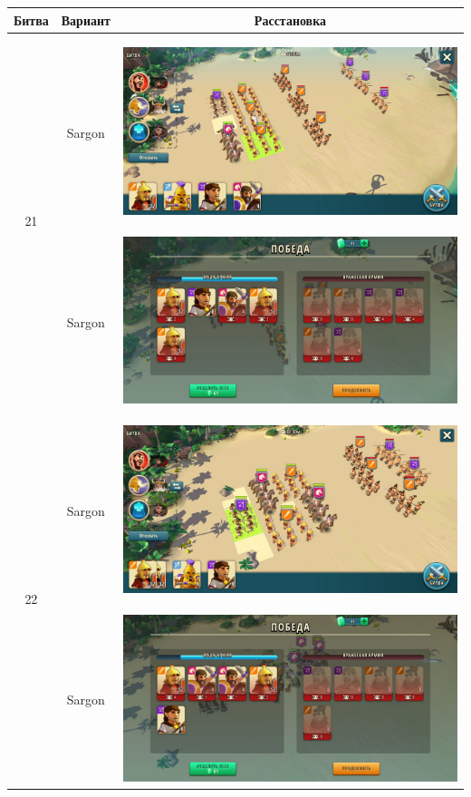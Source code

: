 \noindent
\begin{longtable}{|c|c|c|}
	\hline
	Битва & Вариант & Расстановка \\\hline\endhead
	\multirow{2}{*}{21} & Sargon &
	\hypertarget{fight21}{\includegraphics[width=0.75\linewidth]{./parts/media/TreasureHunt/21/sargon/photo_2022-04-06_18-11-33.jpg}} \\
	& Sargon &
	\includegraphics[width=0.75\linewidth]{./parts/media/TreasureHunt/21/sargon/photo_2022-04-06_18-11-59.jpg} \\
	\hline
	\multirow{8}{*}{22} & Sargon &
	\hypertarget{fight22}{\includegraphics[width=0.75\linewidth]{./parts/media/TreasureHunt/22/sargon/photo_2022-04-06_18-12-03.jpg}} \\
	& Sargon &
	\includegraphics[width=0.75\linewidth]{./parts/media/TreasureHunt/22/sargon/photo_2022-04-06_18-12-13.jpg} \\

\end{longtable}
